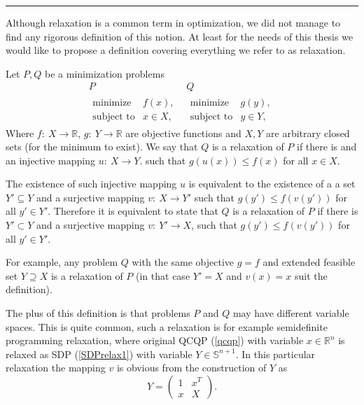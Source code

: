 \documentclass[12pt]{book}
\theoremstyle{definition}
\begin{document}
\bigskip
\hrule
\bigskip

Although relaxation is a common term in optimization, we did not manage to find any rigorous definition of this notion. At least for the needs of this thesis we would like to propose a definition covering everything we refer to as relaxation.


 Let $P, Q$ be a minimization problems
\label{defRelaxationProposed}
\begin{equation}
\begin{array}{cc}
 P & Q \\
\begin{array}{ll}
\mbox{minimize} & f(x), \\
\mbox{subject to} & x\in X,
\end{array} 
&
\begin{array}{ll}
\mbox{minimize} & g(y), \\
\mbox{subject to} & y\in Y,
\end{array} 
\end{array}
\end{equation}
Where $f:\ X\rightarrow \mathbb{R}$, $g:\ Y\rightarrow \mathbb{R}$ are objective functions and $X,Y$ are arbitrary closed sets (for the minimum to exist).
We say that $Q$ is a relaxation of $P$ if there is and an injective mapping $u:\ X\rightarrow Y$. such that $g(u(x)) \leq  f(x)$ for all $x \in X$.



\rem The existence of such injective mapping $u$ is equivalent to the existence of a a set $Y'\subseteq Y$ and a surjective mapping $v:\ X\rightarrow Y'$ such that  $g(y') \leq f(v(y'))$ for all $y'\in Y'$. Therefore it is equivalent to state that $Q$ is a relaxation of $P$ if there is $Y'\subset Y$ and a surjective mapping $v:\ Y'\rightarrow X$, such that $g(y') \leq f(v(y'))$ for all $y'\in Y'$.


For example, any problem $Q$ with the same objective $g=f$ and extended feasible set $Y\supseteq X$ 
is a relaxation of $P$ (in that case  $Y'=X$ and $v(x) = x$ suit the definition). 

The plus of this definition is that problems $P$ and $Q$ may have different variable spaces. This is quite common, such a relaxation is for example semidefinite programming relaxation, where original QCQP (\ref{qcqp}) with variable $x\in \mathbb{R}^n$ is relaxed as SDP (\ref{SDPrelax1}) with variable $Y\in\mathbb{S}^{n+1}$. In this particular relaxation the mapping $v$ is obvious from the construction of $Y$ as
$$Y=\left(
\begin{array}{cc}
1 & x^T\\
x & X
\end{array}\right).
$$
 
\end{document}
